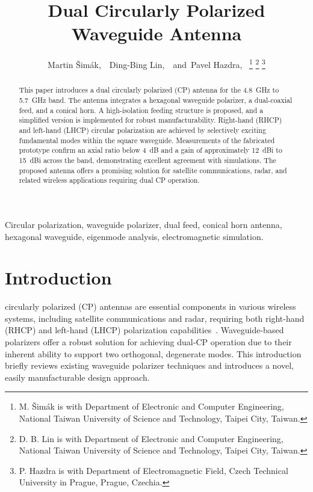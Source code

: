 \documentclass[journal]{IEEEtran}
\title{Dual Circularly Polarized Waveguide Antenna}
\author{Martin Šimák,~\IEEEmembership{Student Member,~IEEE,}~Ding-Bing Lin,~\IEEEmembership{Member,~IEEE,}~and~Pavel Hazdra,~\IEEEmembership{Member,~IEEE}%
\thanks{M. Šimák is with Department of Electronic and Computer Engineering, National Taiwan University of Science and Technology, Taipei City, Taiwan.}%
\thanks{D. B. Lin is with Department of Electronic and Computer Engineering, National Taiwan University of Science and Technology, Taipei City, Taiwan.}%
\thanks{P. Hazdra is with Department of Electromagnetic Field, Czech Technical University in Prague, Prague, Czechia.}%
}
\begin{document}
\maketitle

\begin{abstract}
    This paper introduces a dual circularly polarized (CP) antenna for the 4.8~GHz to 5.7~GHz band. The antenna integrates a hexagonal waveguide polarizer, a dual-coaxial feed, and a conical horn. A high-isolation feeding structure is proposed, and a simplified version is implemented for robust manufacturability. Right-hand (RHCP) and left-hand (LHCP) circular polarization are achieved by selectively exciting fundamental modes within the square waveguide. Measurements of the fabricated prototype confirm an axial ratio below 4~dB and a gain of approximately 12~dBi to 15~dBi across the band, demonstrating excellent agreement with simulations. The proposed antenna offers a promising solution for satellite communications, radar, and related wireless applications requiring dual CP operation.
\end{abstract}

\begin{IEEEkeywords}
Circular polarization, waveguide polarizer, dual feed, conical horn antenna, hexagonal waveguide, eigenmode analysis, electromagnetic simulation.
\end{IEEEkeywords}

\section{Introduction}

 circularly polarized (CP) antennas are essential components in various wireless systems, including satellite communications and radar, requiring both right-hand (RHCP) and left-hand (LHCP) polarization capabilities~\cite{jia-et-al:dual-circularly-polarized-antennas-with-low-cross-polarization-for-gnss-r-applications, zang-et-al:single-layer-dual-circularly-polarized-antenna-elements-for-automotive-radar-at-77-ghz}. Waveguide-based polarizers offer a robust solution for achieving dual-CP operation due to their inherent ability to support two orthogonal, degenerate modes. This introduction briefly reviews existing waveguide polarizer techniques and introduces a novel, easily manufacturable design approach.
\end{document}

